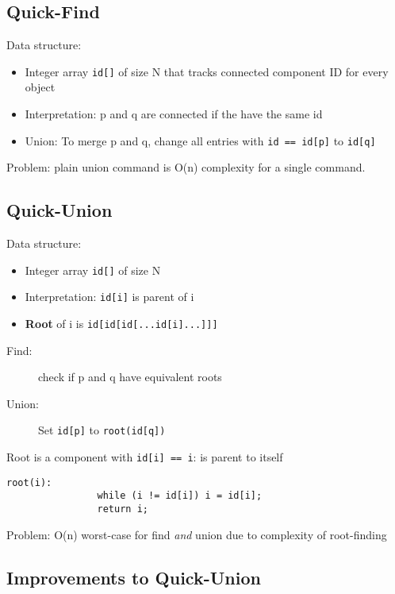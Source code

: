 \documentclass[11pt]{article}
\begin{document}
	\subsection{Quick-Find}
	
		Data structure:
		\begin{itemize}
			\item Integer array \verb|id[]| of size N that tracks connected component 	ID for every object
			\item Interpretation: p and q are connected if the have the same id
			\item Union: To merge p and q, change all entries with \verb|id == id[p]| to \verb|id[q]|
		\end{itemize}
		Problem: plain union command is O(n) complexity for a single command.
		
	\subsection{Quick-Union}
	
		Data structure:
		\begin{itemize}
			\item Integer array \verb|id[]| of size N
			\item Interpretation: \verb|id[i]| is parent of i
			\item \textbf{Root} of i is \verb|id[id[id[...id[i]...]]]|
		\end{itemize}
		\begin{description}
			\item[Find:] check if p and q have equivalent roots
			\item[Union:] Set \verb|id[p]| to \verb|root(id[q])|
		\end{description}
		Root is a component with \verb|id[i] == i|: is parent to itself
		\begin{lstlisting}[autogobble=true]
			root(i):
				while (i != id[i]) i = id[i];
				return i;
		\end{lstlisting}
		Problem: O(n) worst-case for find \emph{and} union due to complexity of root-finding
	
	\subsection{Improvements to Quick-Union}
\end{document}
